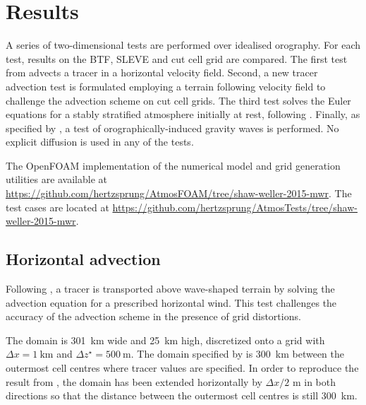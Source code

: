 \documentclass[twocol]{ametsoc}
\begin{document}
\section{Results}
\label{sec:results}

A series of two-dimensional tests are performed over idealised orography.  For each test, results on the BTF, SLEVE and cut cell grid are compared.  The first test from \citet{schaer2002} advects a tracer in a horizontal velocity field.  Second, a new tracer advection test is formulated employing a terrain following velocity field to challenge the advection scheme on cut cell grids.  The third test solves the Euler equations for a stably stratified atmosphere initially at rest, following \citet{klemp2011}.  Finally, as specified by \citet{schaer2002}, a test of orographically-induced gravity waves is performed.  No explicit diffusion is used in any of the tests.

The OpenFOAM implementation of the numerical model and grid generation utilities are available at \url{https://github.com/hertzsprung/AtmosFOAM/tree/shaw-weller-2015-mwr}.  The test cases are located at \url{https://github.com/hertzsprung/AtmosTests/tree/shaw-weller-2015-mwr}.


\subsection{Horizontal advection}

Following \citet{schaer2002}, a tracer is transported above wave-shaped terrain by solving the advection equation for a prescribed horizontal wind.  This test challenges the accuracy of the advection scheme in the presence of grid distortions.

The domain is \SI{301}{\kilo\meter} wide and \SI{25}{\kilo\meter} high, discretized onto a grid with \(\Delta x = \SI{1}{\kilo\meter}\) and \(\Delta z^\star = \SI{500}{\meter}\).  The domain specified by \citet{schaer2002} is \SI{300}{\kilo\meter} between the outermost cell centres where tracer values are specified.  In order to reproduce the result from \citet{schaer2002}, the domain has been extended horizontally by \(\Delta x/2\) \si{\meter} in both directions so that the distance between the outermost cell centres is still \SI{300}{\kilo\meter}.
\end{document}
